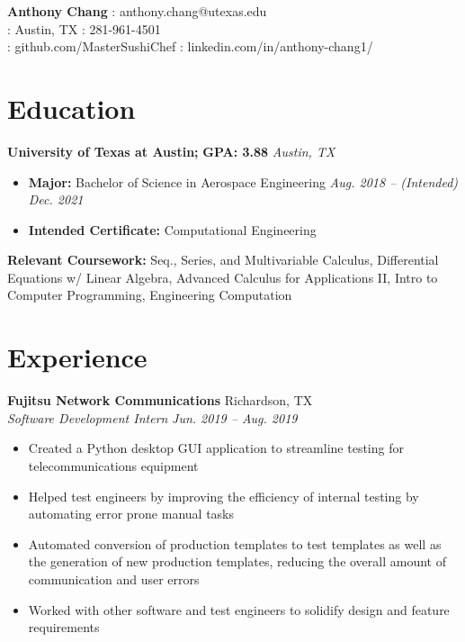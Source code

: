 \documentclass[letterpaper,11pt]{article}
\begin{document}
\textbf{\LARGE{Anthony Chang}} \hfill \faEnvelope: anthony.chang@utexas.edu\\
\faMapMarker: Austin, TX \hfill \faPhone: 281-961-4501\\
\faGithub: github.com/MasterSushiChef \hfill \faLinkedinSquare: linkedin.com/in/anthony-chang1/

{
\section{Education}
\textbf{University of Texas at Austin;} \textbf{GPA: 3.88} \hfill \textit{Austin, TX}\\
\begin{itemize}[noitemsep, topsep=0pt, leftmargin=0.7cm]
  \item \textbf{\small{Major:}} Bachelor of Science in Aerospace Engineering \hfill \textit{Aug. 2018 -- (Intended) Dec. 2021}\\
  \item \textbf{\small{Intended Certificate:}} Computational Engineering\\
\end{itemize}
\textbf{\small{Relevant Coursework:}} Seq., Series, and Multivariable Calculus, Differential Equations w/ Linear Algebra,
Advanced Calculus for Applications II, Intro to Computer Programming, Engineering Computation
}

\section{Experience}
\textbf{Fujitsu Network Communications} \hfill Richardson, TX\\
\textit{Software Development Intern} \hfill \textit{Jun. 2019 -- Aug. 2019}\\
\begin{itemize}[noitemsep, topsep=0pt, leftmargin=0.7cm]
  \item Created a Python desktop GUI application to streamline testing for telecommunications equipment
  \item Helped test engineers by improving the efficiency of internal testing by automating error prone manual tasks
  \item Automated conversion of production templates to test templates as well as the generation of new production templates, reducing the overall amount of communication and user errors
  \item Worked with other software and test engineers to solidify design and feature requirements 
\end{itemize}
\end{document}
